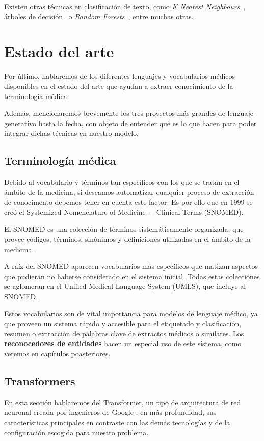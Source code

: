 Existen otras técnicas en clasificación de texto, como \textit{K Nearest Neighbours}~\cite{KNNXiao2007}, árboles de decisión~\cite{DecisionTreeNoorman2018} o \textit{Random Forests}~\cite{breiman2001random}, entre muchas otras. 

\section{Estado del arte}

Por último, hablaremos de los diferentes lenguajes y vocabularios médicos disponibles en el estado del arte que ayudan a extraer conocimiento de la terminología médica.

Además, mencionaremos brevemente los tres proyectos más grandes de lenguaje generativo hasta la fecha, con objeto de entender qué es lo que hacen para poder integrar dichas técnicas en nuestro modelo.

\subsection{Terminología médica}

Debido al vocabulario y términos tan específicos con los que se tratan en el ámbito de la medicina, si deseamos automatizar cualquier proceso de extracción de conocimento debemos tener en cuenta este factor. Es por ello que en 1999 se creó el Systemized Nomenclature of Medicine -– Clinical Terms (SNOMED). 

El SNOMED es una colección de términos sistemáticamente organizada, que provee códigos, términos, sinónimos y definiciones utilizadas en el ámbito de la medicina.

A raíz del SNOMED aparecen vocabularios más específicos que matizan aspectos que pudieran no haberse considerado en el sistema inicial. Todas estas colecciones se aglomeran en el Unified Medical Language System (UMLS), que incluye al SNOMED.

Estos vocabularios son de vital importancia para modelos de lenguaje médico, ya que proveen un sistema rápido y accesible para el etiquetado y clasificación, resumen o extracción de palabras clave de extractos médicos o similares. Los \textbf{reconocedores de entidades} hacen un especial uso de este sistema, como veremos en capítulos poasteriores.



\subsection{Transformers}
En esta sección hablaremos del Transformer, un tipo de arquitectura de red neuronal creada por ingenieros de Google \cite{TransformerAshish2017}, en más profundidad, sus características principales en contraste con las demás tecnologías y de la configuración escogida para nuestro problema.


